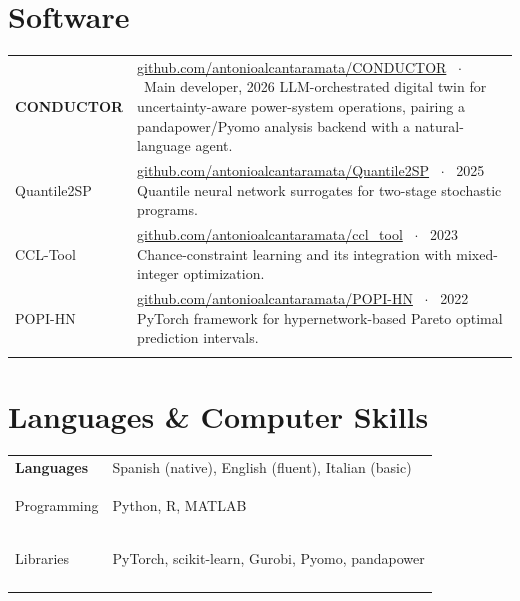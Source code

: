 \documentclass[10pt,a4paper]{article}
\makeatletter
\newenvironment{cvtable}
  {\begin{longtable}{@{} >{\raggedright\arraybackslash\bfseries}p{0.135\textwidth}
                        !{\color{rulegray}\vrule width 0.9pt}
                        >{\raggedright\arraybackslash}p{0.83\textwidth} @{}}}
  {\end{longtable}}
\newcommand{\cvitem}[2]{%
  #1 & #2 \tabularnewline \noalign{\vskip 4pt}%
}
\makeatother
\begin{document}
\section*{Software}
\begin{cvtable}
    \cvitem{CONDUCTOR}{\href{https://github.com/antonioalcantaramata/CONDUCTOR}{github.com/antonioalcantaramata/CONDUCTOR}
    \ $\cdot$ \ {\color{mutedtext}Main developer, 2026}\newline
    LLM-orchestrated digital twin for uncertainty-aware power-system operations,
    pairing a pandapower/Pyomo analysis backend with a natural-language agent.}

    \cvitem{Quantile2SP}{\href{https://github.com/antonioalcantaramata/Quantile2SP}{github.com/antonioalcantaramata/Quantile2SP}
    \ $\cdot$ \ {\color{mutedtext}2025}\newline
    Quantile neural network surrogates for two-stage stochastic programs.}

    \cvitem{CCL-Tool}{\href{https://github.com/antonioalcantaramata/ccl_tool}{github.com/antonioalcantaramata/ccl\_tool}
    \ $\cdot$ \ {\color{mutedtext}2023}\newline
    Chance-constraint learning and its integration with mixed-integer optimization.}

    \cvitem{POPI-HN}{\href{https://github.com/antonioalcantaramata/POPI-HN}{github.com/antonioalcantaramata/POPI-HN}
    \ $\cdot$ \ {\color{mutedtext}2022}\newline
    PyTorch framework for hypernetwork-based Pareto optimal prediction intervals.}
\end{cvtable}

\section*{Languages \& Computer Skills}
\begin{cvtable}
    \cvitem{Languages}{Spanish (native), English (fluent), Italian (basic)}
    \cvitem{Programming}{Python, R, MATLAB}
    \cvitem{Libraries}{PyTorch, scikit-learn, Gurobi, Pyomo, pandapower}
\end{cvtable}
\end{document}
